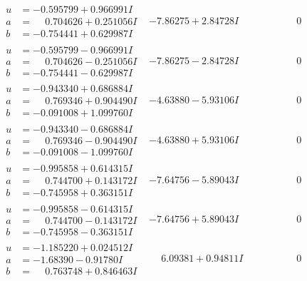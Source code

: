 \documentclass[1p]{elsarticle_modified}
\theoremstyle{definition}
\begin{document}
$$\begin{array}{c|c|c}
\begin{aligned}
u &= -0.595799 + 0.966991 I \\
a &= \phantom{-}0.704626 + 0.251056 I \\
b &= -0.754441 + 0.629987 I\end{aligned}
 & -7.86275 + 2.84728 I & \phantom{-0.000000 } 0 \\ \hline\begin{aligned}
u &= -0.595799 - 0.966991 I \\
a &= \phantom{-}0.704626 - 0.251056 I \\
b &= -0.754441 - 0.629987 I\end{aligned}
 & -7.86275 - 2.84728 I & \phantom{-0.000000 } 0 \\ \hline\begin{aligned}
u &= -0.943340 + 0.686884 I \\
a &= \phantom{-}0.769346 + 0.904490 I \\
b &= -0.091008 + 1.099760 I\end{aligned}
 & -4.63880 - 5.93106 I & \phantom{-0.000000 } 0 \\ \hline\begin{aligned}
u &= -0.943340 - 0.686884 I \\
a &= \phantom{-}0.769346 - 0.904490 I \\
b &= -0.091008 - 1.099760 I\end{aligned}
 & -4.63880 + 5.93106 I & \phantom{-0.000000 } 0 \\ \hline\begin{aligned}
u &= -0.995858 + 0.614315 I \\
a &= \phantom{-}0.744700 + 0.143172 I \\
b &= -0.745958 + 0.363151 I\end{aligned}
 & -7.64756 - 5.89043 I & \phantom{-0.000000 } 0 \\ \hline\begin{aligned}
u &= -0.995858 - 0.614315 I \\
a &= \phantom{-}0.744700 - 0.143172 I \\
b &= -0.745958 - 0.363151 I\end{aligned}
 & -7.64756 + 5.89043 I & \phantom{-0.000000 } 0 \\ \hline\begin{aligned}
u &= -1.185220 + 0.024512 I \\
a &= -1.68390 - 0.91780 I \\
b &= \phantom{-}0.763748 + 0.846463 I\end{aligned}
 & \phantom{-}6.09381 + 0.94811 I & \phantom{-0.000000 } 0 \\ \hline\begin{aligned}

\end{aligned}
\end{array}$$
\end{document}
